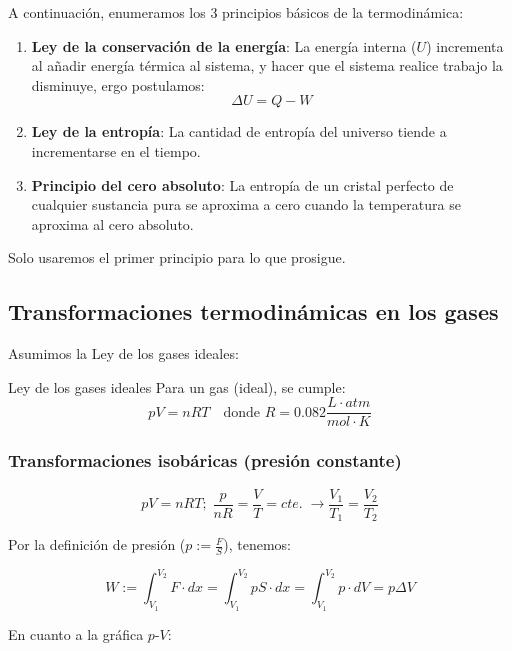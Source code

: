 \documentclass[10pt]{article}
\begin{document}
A continuación, enumeramos los 3 principios básicos de la termodinámica:

\begin{enumerate}
    \item \textbf{Ley de la conservación de la energía}: La energía interna ($ U $) incrementa al añadir energía térmica al sistema, y hacer que el sistema realice trabajo la disminuye, ergo postulamos:
    \[ \Delta U = Q - W \]
    \item \textbf{Ley de la entropía}: La cantidad de entropía del universo tiende a incrementarse en el tiempo.
    \item \textbf{Principio del cero absoluto}: La entropía de un cristal perfecto de cualquier sustancia pura se aproxima a cero cuando la temperatura se aproxima al cero absoluto.
\end{enumerate}

Solo usaremos el primer principio para lo que prosigue.

\subsection{Transformaciones termodinámicas en los gases}

Asumimos la Ley de los gases ideales:

\begin{definition}{Ley de los gases ideales}
    Para un gas (ideal), se cumple:
    \[ pV = nRT \quad \text{donde } R = 0.082 \frac{L \cdot atm}{mol \cdot K} \]
\end{definition}

\subsubsection{Transformaciones isobáricas (presión constante)}

\[ pV = nRT; \; \frac{p}{nR} = \frac{V}{T} = cte. \; \to \frac{V_1}{T_1} = \frac{V_2}{T_2} \]

Por la definición de presión ($ p := \frac{F}{S} $), tenemos:

\[ W := \int_{V_1}^{V_2} F \cdot dx = \int_{V_1}^{V_2} pS \cdot d x = \int_{V_1}^{V_2} p \cdot dV = p \Delta V \]

En cuanto a la gráfica $p$-$V$:

\begin{center}
\end{center}
\end{document}
